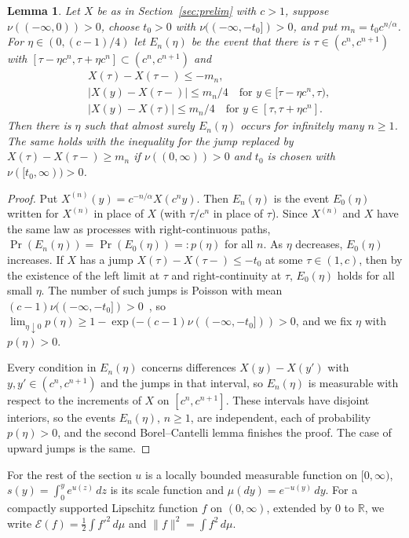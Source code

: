 \documentclass[11pt]{amsart}
\newtheorem{lemma}[theorem]{Lemma}
\theoremstyle{remark}
\newcommand{\R}{\mathbb R}
\newcommand{\cE}{\mathcal E}
\begin{document}
\begin{lemma}\label{lem:jumps}
Let $X$ be as in Section~\ref{sec:prelim} with $c>1$, suppose $\nu((-\infty,0))>0$, choose $t_0>0$ with $\nu((-\infty,-t_0])>0$, and put $m_n=t_0c^{n/\alpha}$. For $\eta\in(0,(c-1)/4)$ let $E_n(\eta)$ be the event that there is $\tau\in(c^n,c^{n+1})$ with $[\tau-\eta c^n,\tau+\eta c^n]\subset(c^n,c^{n+1})$ and
\begin{align*}
&X(\tau)-X(\tau-)\le-m_n,\\
&|X(y)-X(\tau-)|\le m_n/4\quad\text{for }y\in[\tau-\eta c^n,\tau),\\
&|X(y)-X(\tau)|\le m_n/4\quad\text{for }y\in[\tau,\tau+\eta c^n].
\end{align*}
Then there is $\eta$ such that almost surely $E_n(\eta)$ occurs for infinitely many $n\ge1$. The same holds with the inequality for the jump replaced by $X(\tau)-X(\tau-)\ge m_n$ if $\nu((0,\infty))>0$ and $t_0$ is chosen with $\nu([t_0,\infty))>0$.
\end{lemma}

\begin{proof}
Put $X^{(n)}(y)=c^{-n/\alpha}X(c^ny)$. Then $E_n(\eta)$ is the event $E_0(\eta)$ written for $X^{(n)}$ in place of $X$ (with $\tau/c^n$ in place of $\tau$). Since $X^{(n)}$ and $X$ have the same law as processes with right-continuous paths, $\Pr(E_n(\eta))=\Pr(E_0(\eta))=:p(\eta)$ for all $n$. As $\eta$ decreases, $E_0(\eta)$ increases. If $X$ has a jump $X(\tau)-X(\tau-)\le-t_0$ at some $\tau\in(1,c)$, then by the existence of the left limit at $\tau$ and right-continuity at $\tau$, $E_0(\eta)$ holds for all small $\eta$. The number of such jumps is Poisson with mean $(c-1)\nu((-\infty,-t_0])>0$~\cite[Theorem~19.2]{Sato}, so $\lim_{\eta\downarrow0}p(\eta)\ge1-\exp(-(c-1)\nu((-\infty,-t_0]))>0$, and we fix $\eta$ with $p(\eta)>0$.

Every condition in $E_n(\eta)$ concerns differences $X(y)-X(y')$ with $y,y'\in(c^n,c^{n+1})$ and the jumps in that interval, so $E_n(\eta)$ is measurable with respect to the increments of $X$ on $[c^n,c^{n+1}]$. These intervals have disjoint interiors, so the events $E_n(\eta)$, $n\ge1$, are independent, each of probability $p(\eta)>0$, and the second Borel--Cantelli lemma finishes the proof. The case of upward jumps is the same.
\end{proof}

For the rest of the section $u$ is a locally bounded measurable function on $[0,\infty)$, $s(y)=\int_0^ye^{u(z)}\,dz$ is its scale function and $\mu(dy)=e^{-u(y)}\,dy$. For a compactly supported Lipschitz function $f$ on $(0,\infty)$, extended by $0$ to $\R$, we write $\cE(f)=\frac12\int f'^2\,d\mu$ and $\|f\|^2=\int f^2\,d\mu$.
\end{document}
